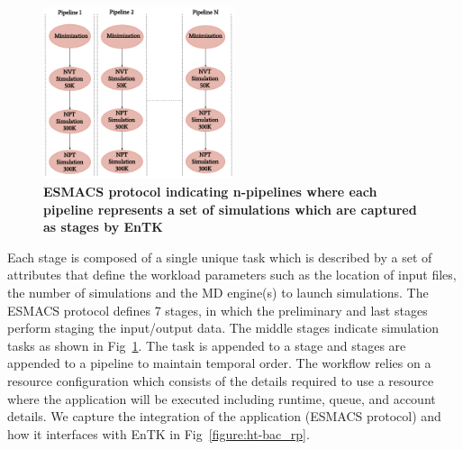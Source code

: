 \begin{figure}[ht]
\centering
  \includegraphics[width=0.5\textwidth]{FIGURES/HT-BAC-NAMD-pipelines-control-flow-only.pdf}
  \caption{\bf ESMACS protocol indicating n-pipelines where each pipeline represents a set of simulations which are captured as stages by EnTK}
   \label{figure:ESMACS-pipelines}
\end{figure}


Each stage is composed of a single unique task which is described by a set of attributes that define the workload parameters such as the location of input files, the number of simulations and the MD engine(s) to launch simulations. The ESMACS protocol defines 7 stages, in which the preliminary and last stages perform staging the input/output data. The middle stages indicate simulation tasks as shown in Fig~\ref{figure:ESMACS-pipelines}. The task is appended to a stage and stages are appended to a pipeline to maintain temporal order. The workflow relies on a resource configuration which consists of the details required to use a resource where the application will be executed including runtime, queue, and account details. We capture the integration of the application (ESMACS protocol) and how it interfaces with EnTK in Fig~\ref{figure:ht-bac_rp}. 

